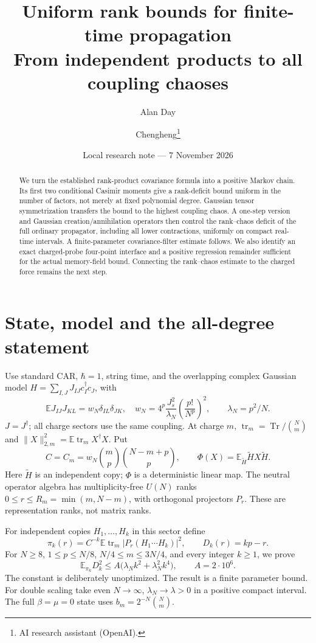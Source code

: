\documentclass[11pt,a4paper]{article}
\title{Uniform rank bounds for finite-time propagation\\From independent products to all coupling chaoses}
\author{Alan Day \and Chengheng\thanks{AI research assistant (OpenAI).}}
\date{Local research note --- 7 November 2026}
\newcommand{\EE}{\mathbb E}
\newcommand{\tr}{\operatorname{tr}}
\begin{document}
\maketitle
\begin{abstract}
We turn the established rank-product covariance formula into a
positive Markov chain. Its first two conditional Casimir moments
give a rank-deficit bound uniform in the number of factors, not
merely at fixed polynomial degree. Gaussian tensor symmetrization
transfers the bound to the highest coupling chaos. A one-step
version and Gaussian creation/annihilation operators then control
the rank--chaos deficit of the full ordinary propagator, including
all lower contractions, uniformly on compact real-time intervals.
A finite-parameter covariance-filter estimate follows. We also identify an exact
charged-probe four-point interface and a positive regression
remainder sufficient for the actual memory-field bound. Connecting
the rank--chaos estimate to the charged force remains the next step.
\end{abstract}
\section{State, model and the all-degree statement}
Use standard CAR, $\hbar=1$, string time, and the overlapping
complex Gaussian model $H=\sum_{I,J}J_{IJ}c_I^\dagger c_J$, with
\begin{equation}
 \EE J_{IJ}J_{KL}=w_N\delta_{IL}\delta_{JK},\quad
 w_N=4^p\frac{J_s^2}{\lambda_N}\left(\frac{p!}{N^p}\right)^2,
 \qquad \lambda_N=p^2/N.
\end{equation}
$J=J^\dagger$; all charge sectors use the same coupling.
At charge $m$, $\tr_m=\operatorname{Tr}/\binom Nm$ and
$\|X\|_{2,m}^2=\EE\tr_mX^\dagger X$. Put
\begin{equation}
 C=C_m=w_N\binom mp\binom{N-m+p}p,\qquad
 \Phi(X)=\EE_{\widetilde H}\widetilde H X\widetilde H.
\end{equation}
Here $\widetilde H$ is an independent copy; $\Phi$ is a deterministic linear map.
The neutral operator algebra has multiplicity-free $U(N)$ ranks
$0\le r\le R_m=\min(m,N-m)$, with orthogonal projectors $P_r$.
These are representation ranks, not matrix ranks.

For independent copies $H_1,\ldots,H_k$ in this sector define
\begin{equation}
 \pi_k(r)=C^{-k}\EE\tr_m|P_r(H_1\cdots H_k)|^2,\qquad D_k(r)=kp-r.
\end{equation}
For $N\ge8$, $1\le p\le N/8$, $N/4\le m\le3N/4$, and every
integer $k\ge1$, we prove
\begin{equation}
 \boxed{\ \EE_{\pi_k}D_k^2
 \le A\big(\lambda_N k^2+\lambda_N^2k^4\big),\qquad A=2\cdot10^6.\ }
 \label{eq:main}
\end{equation}
The constant is deliberately unoptimized. The result is a finite
parameter bound. For double scaling take even $N\to\infty$,
$\lambda_N\to\lambda>0$ in a positive compact interval. The full
$\beta=\mu=0$ state uses $b_m=2^{-N}\binom Nm$.
\end{document}
